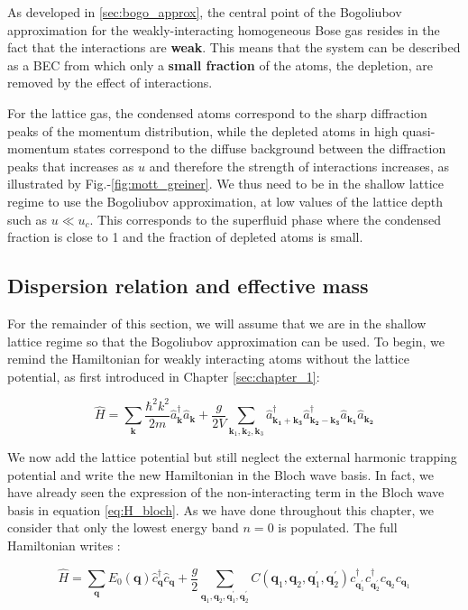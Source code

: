 As developed in \ref{sec:bogo_approx}, the central point of the Bogoliubov approximation for the weakly-interacting homogeneous Bose gas resides in the fact that the interactions are \textbf{weak}. This means that the system can be described as a BEC from which only a \textbf{small fraction} of the atoms, the depletion, are removed by the effect of interactions.

For the lattice gas, the condensed atoms correspond to the sharp diffraction peaks of the momentum distribution, while the depleted atoms in high quasi-momentum states correspond to the diffuse background between the diffraction peaks that increases as $u$ and therefore the strength of interactions increases, as illustrated by Fig.-\ref{fig:mott_greiner}. We thus need to be in the shallow lattice regime to use the Bogoliubov approximation, \ie at low values of the lattice depth such as $u \ll u_c$. This corresponds to the superfluid phase where the condensed fraction is close to 1 and the fraction of depleted atoms is small.


\subsection{Dispersion relation and effective mass}

For the remainder of this section, we will assume that we are in the shallow lattice regime so that the Bogoliubov approximation can be used. To begin, we remind the Hamiltonian for weakly interacting atoms without the lattice potential, as first introduced in Chapter \ref{sec:chapter_1}:

\begin{equation}
    \hat{H}=\sum_{\bm{k}}\frac{\hbar^2 k^2}{2m} \hat{a}^{\dagger}_{\bm{k}}  \hat{a}_{\bm{k}} +  \frac{g}{2V} \sum_{\bm{k}_1,\bm{k}_2,\bm{k}_3} \hat{a}^{\dagger}_{\bm{k_1}+\bm{k_3}} \hat{a}^{\dagger}_{\bm{k_2}-\bm{k_3}} \hat{a}_{\bm{k_1}} \hat{a}_{\bm{k_2}} 
\end{equation}

\noindent We now add the lattice potential but still neglect the external harmonic trapping potential and write the new Hamiltonian in the Bloch wave basis. In fact, we have already seen the expression of the non-interacting term in the Bloch wave basis in equation \ref{eq:H_bloch}. As we have done throughout this chapter, we consider that only the lowest energy band $n=0$ is populated. The full Hamiltonian writes \cite{dalibard2013cages}:

\begin{equation}
    \hat{H}=\sum_{\bm{q}} E_{0}(\bm{q}) \hat{c}_{\bm{q}}^{\dagger} \hat{c}_{\bm{q}}+\frac{g}{2} \sum_{\bm{q}_{1}, \bm{q}_{2}, \bm{q}_{1}^{\prime}, \bm{q}_{2}^{\prime}} C\left(\bm{q}_{1}, \bm{q}_{2}, \bm{q}_{1}^{\prime}, \bm{q}_{2}^{\prime}\right) c_{\bm{q}_{1}^{\prime}}^{\dagger} c_{\bm{q}_{2}^{\prime}}^{\dagger} c_{\bm{q}_{2}} c_{\bm{q}_{1}}
    \label{eq:lattice_bogo_hamiltonian}
\end{equation}

